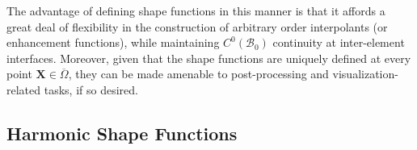 	
	The advantage of defining shape functions in this manner is that it affords a great deal of flexibility in the construction of arbitrary order interpolants (or enhancement functions), while maintaining $C^0 (\mathcal{B}_0)$ continuity at inter-element interfaces. Moreover, given that the shape functions are uniquely defined at every point $\mathbf{X} \in \overline{\Omega}$, they can be made amenable to post-processing and visualization-related tasks, if so desired.
	

\subsection*{Harmonic Shape Functions}


